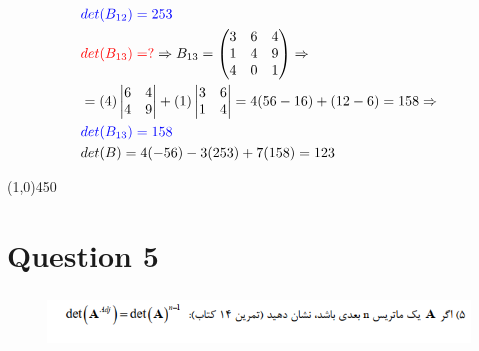 \documentclass[a4paper,12pt]{article}
\begin{document}
\begin{doublespace}
\begin{align*}
		& \textcolor{blue}{det(B_{12}) = 253 } \\
		& \textcolor{red}{det(B_{13}) = ? } \Rightarrow  B_{13} = \begin{pmatrix} 3 & 6 & 4\\ 1  & 4 & 9\\ 4 & 0 & 1\\ \end{pmatrix} \Rightarrow \\%
		& = (4)\begin{vmatrix} 6 & 4  \\ 4 & 9 \\ \end{vmatrix}  + (1)\begin{vmatrix}3 & 6 \\ 1 & 4  \\ \end{vmatrix} = 4(56-16)  + (12-6) = 158 \Rightarrow \\
		& \textcolor{blue}{det(B_{13}) = 158 } \\
		&det(B) = 4(-56) -3(253) +7(158) = 123 \\
	\end{align*}
\end{doublespace}
\line(1,0){450}
\newpage
\section {Question 5 }

\begin{figure}[h!]
	\centering
	\includegraphics*[height=1.5cm]{Q5}
\end{figure}
\end{document}
